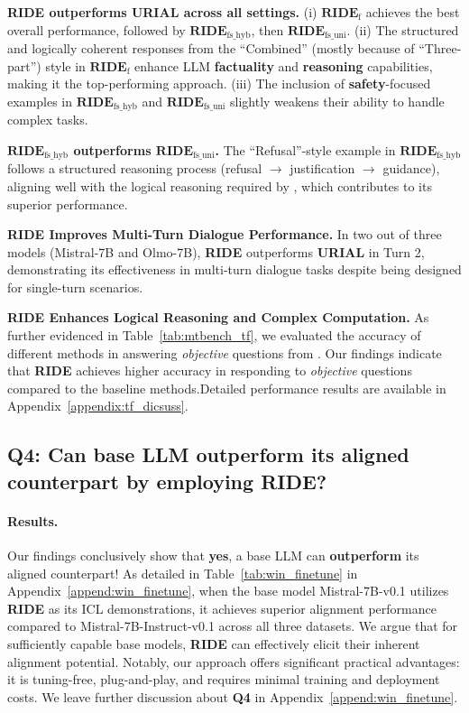 \textbf{\textbf{RIDE} outperforms \textbf{URIAL} across all settings.} (i) $\textbf{RIDE}_{\text{f}}$ achieves the best overall performance, followed by $\textbf{RIDE}_{\text{fs\_hyb}}$, then $\textbf{RIDE}_{\text{fs\_uni}}$.
(ii) The structured and logically coherent responses from the ``Combined'' (mostly because of ``Three-part'') style in $\textbf{RIDE}_{\text{f}}$ enhance LLM \textbf{\color{myblue} factuality} and \textbf{reasoning} capabilities, making it the top-performing approach.
(iii) The inclusion of \textbf{\color{myred} safety}-focused examples in $\textbf{RIDE}_{\text{fs\_hyb}}$ and $\textbf{RIDE}_{\text{fs\_uni}}$ slightly weakens their ability to handle complex tasks.

\textbf{$\textbf{RIDE}_{\text{fs\_hyb}}$ outperforms $\textbf{RIDE}_{\text{fs\_uni}}$.} The ``Refusal''-style example in $\textbf{RIDE}_{\text{fs\_hyb}}$ follows a structured reasoning process (refusal $\rightarrow$ justification $\rightarrow$ guidance), aligning well with the logical reasoning required by \mtbench{}, which contributes to its superior performance.

\textbf{\textbf{RIDE} Improves Multi-Turn Dialogue Performance.} In two out of three models (Mistral-7B and Olmo-7B), \textbf{RIDE} outperforms \textbf{URIAL} in Turn 2, demonstrating its effectiveness in multi-turn dialogue tasks despite being designed for single-turn scenarios.

\textbf{\textbf{RIDE} Enhances Logical Reasoning and Complex Computation.} As further evidenced in Table~\ref{tab:mtbench_tf}, we evaluated the accuracy of different methods in answering \textit{objective} questions from \mtbench{}. Our findings indicate that \textbf{RIDE} achieves higher accuracy in responding to \textit{objective} questions compared to the baseline methods.Detailed performance results are available in Appendix~\ref{appendix:tf_dicsuss}.

\subsection{Q4: Can base LLM outperform its aligned counterpart by employing \textbf{RIDE}?}
\label{ssec:exp_win_finetune}

\paragraph{Results.}
Our findings conclusively show that \textbf{yes}, a base LLM can \textbf{outperform} its aligned counterpart! As detailed in Table~\ref{tab:win_finetune} in Appendix~\ref{append:win_finetune}, when the base model Mistral-7B-v0.1 utilizes \textbf{RIDE} as its ICL demonstrations, it achieves superior alignment performance compared to Mistral-7B-Instruct-v0.1 across all three datasets. 
We argue that for sufficiently capable base models, \textbf{RIDE} can effectively elicit their inherent alignment potential. Notably, our approach offers significant practical advantages: it is tuning-free, plug-and-play, and requires minimal training and deployment costs.
We leave further discussion about \textbf{Q4} in Appendix~\ref{append:win_finetune}.

